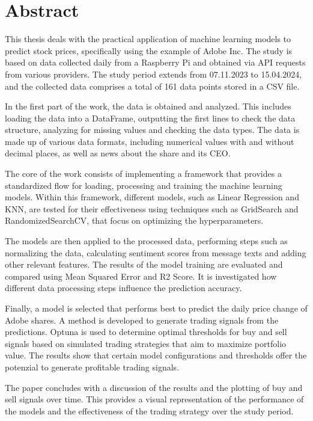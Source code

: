 \clearpage


\section*{Abstract}\label{sec: Abstract}
This thesis deals with the practical application of machine learning models to predict stock prices, specifically using the example of Adobe Inc. The study is based on data collected daily from a Raspberry Pi and obtained via API requests from various providers. The study period extends from 07.11.2023 to 15.04.2024, and the collected data comprises a total of 161 data points stored in a CSV file.
\par
In the first part of the work, the data is obtained and analyzed. This includes loading the data into a DataFrame, outputting the first lines to check the data structure, analyzing for missing values and checking the data types. The data is made up of various data formats, including numerical values with and without decimal places, as well as news about the share and its CEO.
\par
The core of the work consists of implementing a framework that provides a standardized flow for loading, processing and training the machine learning models. Within this framework, different models, such as Linear Regression and KNN, are tested for their effectiveness using techniques such as GridSearch and RandomizedSearchCV, that focus on optimizing the hyperparameters.
\par
The models are then applied to the processed data, performing steps such as normalizing the data, calculating sentiment scores from message texts and adding other relevant features. The results of the model training are evaluated and compared using Mean Squared Error and R2 Score. It is investigated how different data processing steps influence the prediction accuracy.
\par
Finally, a model is selected that performs best to predict the daily price change of Adobe shares. A method is developed to generate trading signals from the predictions. Optuna is used to determine optimal thresholds for buy and sell signals based on simulated trading strategies that aim to maximize portfolio value. The results show that certain model configurations and thresholds offer the potenzial to generate profitable trading signals.
\par
The paper concludes with a discussion of the results and the plotting of buy and sell signals over time. This provides a visual representation of the performance of the models and the effectiveness of the trading strategy over the study period.
